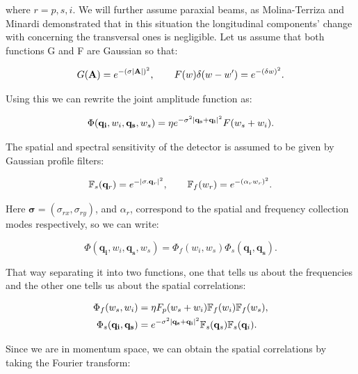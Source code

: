 \documentclass[12pt]{article}
\begin{document}
where $r=p,s,i$. We will further assume paraxial beams,  as Molina-Terriza and Minardi \cite{minardi} demonstrated that in this situation the longitudinal components' change with concerning the transversal ones is negligible. Let us assume that both functions G and F are Gaussian so that:

\begin{equation}
G(\mathbf{A})=e^{- (\sigma \abs{\mathbf{A}})^{2} },\qquad F(w)\delta(w-w')=e^{-(\delta w)^2}.
\end{equation}

Using this we can rewrite the joint amplitude function as:

\begin{equation}
\Phi(\mathbf{q_{i}},w_{i},\mathbf{q_{s}},w_{s})= \eta e^{-\sigma^{2}\abs{\mathbf{q_{s}}+\mathbf{q_{i}}}^{2}} F(w_{s}+w_{i}).
\end{equation}

The spatial and spectral sensitivity of the detector is assumed to be given by Gaussian profile filters:

\begin{equation}
\mathbb{F}_{s}(\mathbf{q}_{r})=e^{-\abs{\mathbf{\sigma}.\mathbf{q}_{r}}^{2}},\qquad \mathbb{F}_{f}(w_{r})=e^{-(\alpha_{r} w_{r})^{2}}.
\end{equation}

Here $\mathbf{\sigma}=(\sigma_{rx},\sigma_{ry})$, and $\alpha_{r}$, correspond to the spatial and frequency collection modes respectively, so we can write:
 
\begin{equation}
\Phi(\mathbf{q_{i}},w_{i},\mathbf{q_{s}},w_{s})=\Phi_{f}(w_{i},w_{s})\Phi_{s}(\mathbf{q_{i}},\mathbf{q_{s}}).
\end{equation}

That way separating it into two functions, one that tells us about the frequencies  and the other one tells us about the spatial correlations:

\begin{align}
\Phi_{f}(w_{s},w_{i})&= \eta F_{p}(w_{s}+w_{i}) \mathbb{F}_{f}(w_{i})\mathbb{F}_{f}(w_{s}),\\
\Phi_{s}(\mathbf{q_{i}},\mathbf{q_{s}})&=e^{-\sigma^{2}\abs{\mathbf{q_{s}}+\mathbf{q_{i}}}^{2}}\mathbb{F}_{s}(\mathbf{q}_{s})\mathbb{F}_{s}(\mathbf{q}_{i}).
\end{align}

Since we are in momentum space, we can obtain the spatial correlations by taking the Fourier transform:
\end{document}
